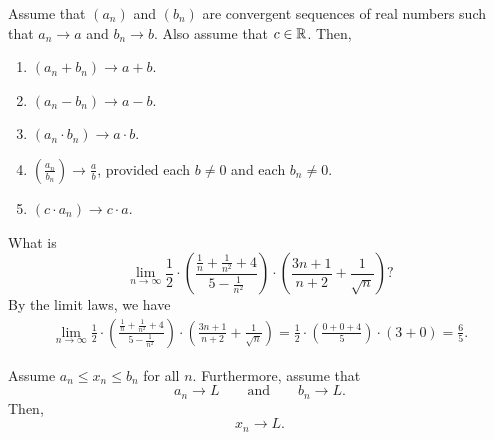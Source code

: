 \documentclass[11pt,twoside=off,numbers=noenddot]{scrbook}
\begin{document}
\begin{theorem}
  Assume that $(a_n)$ and $(b_n)$ are convergent sequences of real
  numbers such that $a_n \to a$ and $b_n \to b$. Also assume that $c
  \in \mathbb R$. Then,
  \begin{enumerate}
    \item $(a_n + b_n) \to a + b$.
    \item $(a_n - b_n) \to a - b$.
    \item $(a_n \cdot b_n) \to a \cdot b$.
    \item $(\frac{a_n}{b_n}) \to \frac{a}{b}$, provided each $b \neq
      0$ and each $b_n \neq 0$.
    \item $(c \cdot a_n) \to c \cdot a$.
  \end{enumerate}
\end{theorem}

\begin{example}
  What is
  \[ \lim_{n\to\infty} \frac{1}{2} \cdot \left(\frac{\frac{1}{n} +
    \frac{1}{n^2} + 4}{5 - \frac{1}{n^2}}\right) \cdot
  \left(\frac{3n+1}{n+2} + \frac{1}{\sqrt{n}}\right)? \]
  By the limit laws, we have
  \begin{align*}
    \lim_{n\to\infty} \frac{1}{2} \cdot \left(\frac{\frac{1}{n} +
    \frac{1}{n^2} + 4}{5 - \frac{1}{n^2}}\right) \cdot
    \left(\frac{3n+1}{n+2} + \frac{1}{\sqrt{n}}\right) = \frac{1}{2}
    \cdot \left(\frac{0 + 0 + 4}{5}\right) \cdot (3 + 0) = \frac{6}{5}.
  \end{align*}
\end{example}

\begin{theorem}
  Assume $a_n \leq x_n \leq b_n$ for all $n$. Furthermore, assume that
  \[ a_n \to L \qquad \text{and} \qquad b_n \to L. \]
  Then,
  \[ x_n \to L. \]
\end{theorem}
\end{document}

